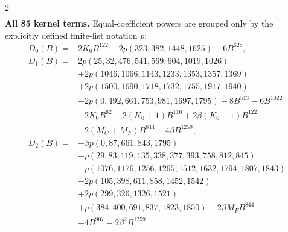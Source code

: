 \documentclass[10pt]{article}
\begin{document}
\begin{multicols}{2}
\[\begin{aligned}
\end{aligned}
\]
\textbf{All 85 kernel terms.} Equal-coefficient powers are grouped only by
the explicitly defined finite-list notation $p$:
\[
\begin{aligned}
D_0(B)={}&2K_0B^{122}-2p(323,382,1448,1625)-6B^{628},\\
D_1(B)={}&2p(25,32,476,541,569,604,1019,1026)\\
 &+2p(1046,1066,1143,1233,1353,1357,1369)\\
 &+2p(1500,1690,1718,1732,1755,1917,1940)\\
 &-2p(0,492,661,753,981,1697,1795)-8B^{513}-6B^{1022}\\
 &-2K_0B^{62}-2(K_0+1)B^{116}+2\beta(K_0+1)B^{122}\\
 &-2(M_C+M_F)B^{844}-4\beta B^{1259},\\
D_2(B)={}&-\beta p(0,87,661,843,1795)\\
 &-p(29,83,119,135,338,377,393,758,812,845)\\
 &-p(1076,1176,1256,1295,1512,1632,1794,1807,1843)\\
 &-2p(105,398,611,858,1452,1542)\\
 &+2p(299,326,1326,1521)\\
 &+p(384,400,691,837,1823,1850)-2\beta M_FB^{844}\\
 &-4B^{907}-2\beta^2B^{1259}.
\end{aligned}
\]


\end{multicols}
\end{document}
